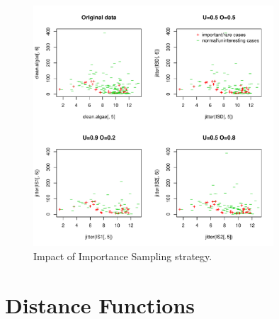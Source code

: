 \documentclass[10pt,a4paper]{article}\usepackage[]{graphicx}\usepackage[]{color}
\newenvironment{knitrout}{}{} %
\begin{document}
\begin{knitrout}\footnotesize
{}\color{fgcolor}\begin{figure}

{\centering \includegraphics[width=0.8\textwidth]{figures/UBL-IS_plot4-1} 

}

\caption[Impact of Importance Sampling strategy]{Impact of Importance Sampling strategy.}\label{fig:IS_plot4}
\end{figure}


\end{knitrout}



\section{Distance Functions}\label{sec:distFunc}
\end{document}
